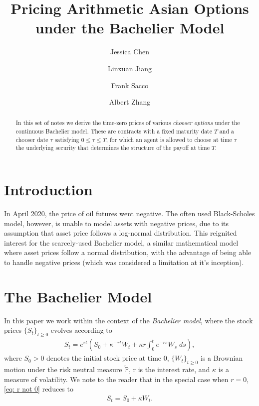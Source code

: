 \documentclass[reqno]{amsart}
\title{Pricing Arithmetic Asian Options under the Bachelier Model} %
\author{Jessica Chen}
\author{Linxuan Jiang}
\author{Frank Sacco}
\author{Albert Zhang}
\begin{document}
\begin{abstract}
     In this set of notes we derive the time-zero prices of various \emph{chooser options} under the continuous Bachelier model.
     These are contracts with a fixed maturity date $T$ and a chooser date $\tau$ satisfying $0 \le \tau \le T$, for which an agent is allowed to choose at time $\tau$ the underlying security that determines the structure of the payoff at time $T$.  
\end{abstract}


\maketitle  
\tableofcontents

\section{Introduction}
In April 2020, the price of oil futures went negative.
The often used Black-Scholes model, however, is unable to model assets with negative prices, due to its assumption that asset price follows a log-normal distribution.
This reignited interest for the scarcely-used Bachelier model, a similar mathematical model where asset prices follow a normal distribution, with the advantage of being able to handle negative prices (which was considered a limitation at it's inception).

\section{The Bachelier Model}
In this paper we work within the context of the \emph{Bachelier model}, where the stock prices $\{S_t\}_{t \ge 0}$ evolves according to 
\begin{align}\label{eq: r not 0}
	 S_t = e^{rt} \left( S_0 + \kappa^{-rt}W_t + \kappa r \int_0^t e^{-rs} W_s \; ds \right),
\end{align}
where $S_0 > 0$ denotes the initial stock price at time 0, $\{W_t\}_{t \ge 0}$ is a Brownian motion under the risk neutral measure $\tilde{\mathbb{P}}$, r is the interest rate, and $\kappa$ is a measure of volatility.
We note to the reader that in the special case when $r = 0$, \eqref{eq: r not 0} reduces to 
\begin{align}\label{eq: r=0}
      S_t = S_0 + \kappa W_t. 
\end{align}
\end{document}
